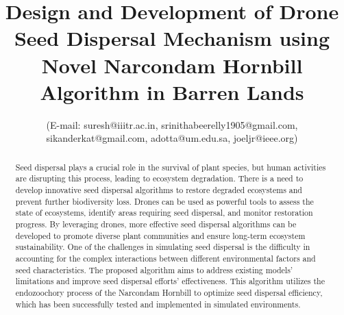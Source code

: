 \documentclass[conference]{IEEEtran}
\begin{document}
\title{Design and Development of Drone Seed Dispersal Mechanism using Novel Narcondam Hornbill Algorithm in Barren Lands}
 
\author{	

\vspace{0.1in}
(E-mail: suresh@iiitr.ac.in, srinithabeerelly1905@gmail.com,  sikanderkat@gmail.com, adotta@um.edu.sa, joeljr@ieee.org)}

\maketitle

\begin{abstract}
Seed dispersal plays a crucial role in the survival of plant species, but human activities are disrupting this process, leading to ecosystem degradation. There is a need to develop innovative seed dispersal algorithms to restore degraded ecosystems and prevent further biodiversity loss. Drones can be used as powerful tools to assess the state of ecosystems, identify areas requiring seed dispersal, and monitor restoration progress. By leveraging drones, more effective seed dispersal algorithms can be developed to promote diverse plant communities and ensure long-term ecosystem sustainability. One of the challenges in simulating seed dispersal is the difficulty in accounting for the complex interactions between different environmental factors and seed characteristics. The proposed algorithm aims to address existing models' limitations and improve seed dispersal efforts' effectiveness. This algorithm utilizes the endozoochory process of the Narcondam Hornbill to optimize seed dispersal efficiency, which has been successfully tested and implemented in simulated environments.
\end{abstract}
\end{document}
